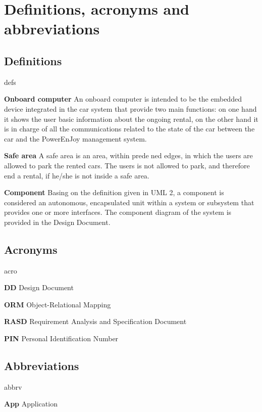 
\section{Definitions, acronyms and abbreviations}

\subsection{Definitions}
	\begin{labeling}{defs}
		\item[\textbf{Onboard computer}] An onboard computer is intended to be the embedded device integrated in the car system that provide two main functions: on one hand it shows the user basic information about the ongoing rental, on the other hand it is in charge of all the communications related to the state of the car between the car and the PowerEnJoy management system.
		\item[\textbf{Safe area}] A safe area is an area, within predened edges, in which the users are allowed to park the rented cars. The users is not allowed to park, and therefore end a rental, if he/she is not inside a safe area.
		\item[\textbf{Component}] Basing on the definition given in UML 2, a component is considered an autonomous, encapsulated unit within a system or subsystem that provides one or more interfaces. The component diagram of the system is provided in the Design Document.
	\end{labeling}

\subsection{Acronyms}
	\begin{labeling}{acro}
		\item[\textbf{DD}] Design Document
		\item[\textbf{ORM}] Object-Relational Mapping
		\item[\textbf{RASD}] Requirement Analysis and Specification Document
		\item[\textbf{PIN}] Personal Identification Number
	\end{labeling}

\subsection{Abbreviations}
	\begin{labeling}{abbrv}
		\item[\textbf{App}] Application
	\end{labeling}